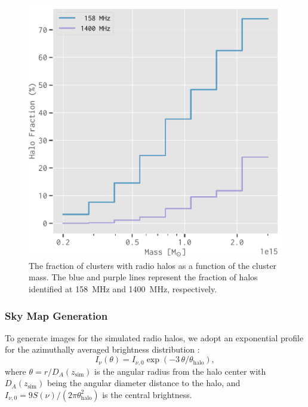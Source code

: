 \documentclass[twocolumn]{aastex62}
\newcommand{\R}[1]{\mathrm{#1}}
\newcommand{\editone}[1]{{\leavevmode\color{cyan}#1}}
\begin{document}
\begin{figure}
  \centering
  \includegraphics[width=\columnwidth]{halo-fraction}
  \caption{\label{fig:halo-fraction}\editone{%
    The fraction of clusters with radio halos as a function of the cluster
    mass.
    The blue and purple lines represent the fraction of halos identified at
    \SI{158}{\MHz} and \SI{1400}{\MHz}, respectively.
  }}
\end{figure}


\subsubsection{\editone{Sky Map Generation}}
\label{sec:skymaps}

To generate images for the simulated radio halos, we adopt an
exponential profile for the azimuthally averaged brightness distribution
\citep{murgia2009}:
\begin{equation}
  \label{eq:halo-profile}
  I_{\nu}(\theta) = I_{\nu,0} \exp(-3 \,\theta / \theta_{\R{halo}}),
\end{equation}
where $\theta = r / D_{\!A}(z_{\R{sim}})$ is the angular radius from the
halo center with $D_{\!A}(z_{\R{sim}})$ being the angular diameter
distance to the halo,
and $I_{\nu,0} = 9 S(\nu) / (2\pi \theta^2_{\R{halo}})$ is the central
brightness.
\end{document}
